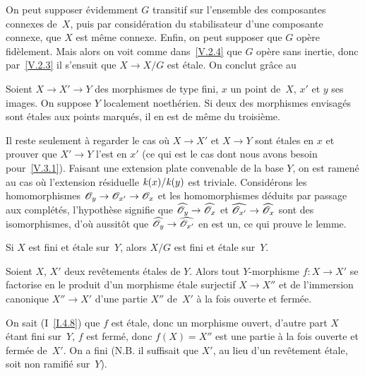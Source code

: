 On peut supposer \'evidemment $G$ transitif sur l'ensemble des
composantes connexes de~$X$, puis par consid\'eration du
stabilisateur d'une composante connexe, que $X$ est m\^eme
connexe. Enfin, on peut supposer que $G$ op\`ere fid\`element.
Mais alors on voit comme dans~\ref{V.2.4} que $G$ op\`ere sans
inertie, donc par~\ref{V.2.3} il s'ensuit que $X \to X/G$ est
\'etale. On conclut gr\^ace au

\begin{lemme}
\label{V.3.3} Soient $X \to X' \to
Y$ des morphismes de type fini, $x$ un point de~$X$, $x'$ et $y$ ses
images. On suppose $Y$ localement noeth\'erien. Si deux des
morphismes envisag\'es sont \'etales aux points marqu\'es, il en est
de m\^eme du troisi\`eme.
\end{lemme}

Il reste seulement \`a regarder le cas o\`u $X \to X'$ et $X \to
Y$ sont \'etales en $x$ et prouver que $X' \to Y$ l'est en $x'$ (ce
qui est le cas dont nous avons besoin
pour~\ref{V.3.1}). Faisant une extension plate convenable de la base
$Y$, on est ramen\'e au cas o\`u l'extension r\'esiduelle
$\mathit{k}(x)/\mathit{k}(y)$
est triviale. Consid\'erons les homomorphismes
$\cal{O}_y \to \cal{O}_{x'} \to \cal{O}_x$ et les homomorphismes
d\'eduits par passage aux compl\'et\'es, l'hypoth\`ese
signifie que $\hat{\cal{O}_y} \to \hat{\cal{O}_x}$ et
$\hat{\cal{O}_{x'}} \to \hat{\cal{O}_x}$ sont des isomorphismes,
d'o\`u aussit\^ot que $\hat{\cal{O}_y} \to \hat{\cal{O}_{x'}}$ en
est un, ce qui prouve le lemme.

\begin{corollaire}
\label{V.3.4} Si $X$ est fini et \'etale sur~$Y$, alors $X/G$
est fini et \'etale sur~$Y$.
\end{corollaire}

\begin{proposition}
\label{V.3.5} Soient $X$, $X'$ deux rev\^etements \'etales de
$Y$. Alors tout $Y$-morphisme $f \colon X \to X'$ se factorise en le
produit d'un morphisme \'etale surjectif $X \to X''$ et de
l'immersion canonique $X'' \to X'$ d'une partie $X''$ de~$X'$ \`a la
fois ouverte et ferm\'ee.
\end{proposition}

On sait (I~\ref{I.4.8}) que $f$ est \'etale, donc un morphisme
ouvert, d'autre part $X$ \'etant fini sur~$Y$, $f$ est ferm\'e,
donc $f(X)=X''$ est une partie \`a la fois ouverte et ferm\'ee de~$X'$. On a fini (N.B. il suffisait que $X'$, au lieu d'un
rev\^etement \'etale, soit non ramifi\'e sur~$Y$).

